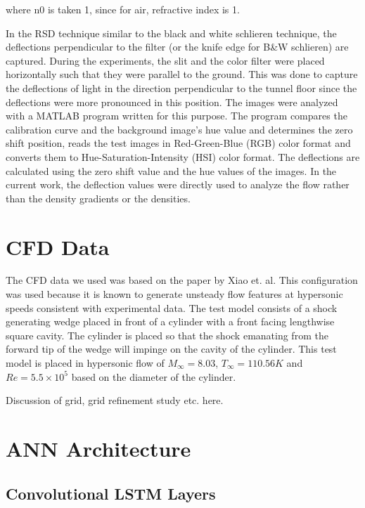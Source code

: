 \documentclass{article}
\begin{document}
where n0 is taken 1, since for air, refractive index is 1.

	In the RSD technique similar to the black and white schlieren technique, the deflections perpendicular to the filter (or the knife edge for B\&W schlieren) are captured. During the experiments, the slit and the color filter were placed horizontally such that they were parallel to the ground. This was done to capture the deflections of light in the direction perpendicular to the tunnel floor since the deflections were more pronounced in this position.
	The images were analyzed with a MATLAB program written for this purpose. The program compares the calibration curve and the background image’s hue value and determines the zero shift position, reads the test images in Red-Green-Blue (RGB) color format and converts them to Hue-Saturation-Intensity (HSI) color format. The deflections are calculated using the zero shift value and the hue values of the images. In the current work, the deflection values were directly used to analyze the flow rather than the density gradients or the densities.

\section{CFD Data}
The CFD data we used was based on the paper by Xiao et. al.  This configuration was used because it is known to generate unsteady flow features at hypersonic speeds consistent with experimental data.  The test model consists of  a shock generating wedge placed in front of a cylinder with a front facing lengthwise square cavity.  The cylinder is placed so that the shock emanating from the forward tip of the wedge will impinge on the cavity of the cylinder.
This test model is placed in hypersonic flow of $M_\infty=8.03$, $T_\infty=110.56K$ and $Re=5.5\times 10^5$ based on the diameter of the cylinder.

Discussion of grid, grid refinement study etc. here.

\section{ANN Architecture}
\subsection{Convolutional LSTM Layers}
\end{document}

